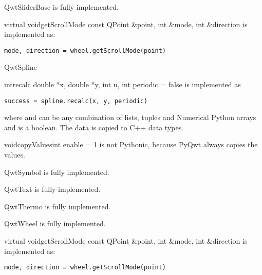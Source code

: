 \documentclass{manual}
\begin{document}
\begin{classdesc*}{QwtSliderBase}
  is fully implemented.

  \begin{cfuncdesc}{virtual void}{getScrollMode}{
      const QPoint \&point, int \&mode, int \&direction}
    is implemented as:
    \begin{verbatim}
mode, direction = wheel.getScrollMode(point)
    \end{verbatim}    
  \end{cfuncdesc}

\end{classdesc*}

\begin{classdesc*}{QwtSpline}
  
  \begin{cfuncdesc}{int}{recalc}{
      double *x, double *y, int n, int periodic = false}
    is implemented as
    \begin{verbatim}
success = spline.recalc(x, y, periodic)
    \end{verbatim}
    where  and  can be any combination of lists, tuples and
    Numerical Python arrays and  is a boolean.
    The data is copied to C++ data types.
  \end{cfuncdesc}
  
  \begin{cfuncdesc}{void}{copyValues}{int enable = 1}
    is not Pythonic, because PyQwt always copies the values.
  \end{cfuncdesc}

\end{classdesc*}
 
\begin{classdesc*}{QwtSymbol}
  is fully implemented.
\end{classdesc*}

\begin{classdesc*}{QwtText}
  is fully implemented.
\end{classdesc*}

\begin{classdesc*}{QwtThermo}
  is fully implemented.
\end{classdesc*}

\begin{classdesc*}{QwtWheel}
  is fully implemented.

  \begin{cfuncdesc}{virtual void}{getScrollMode}{
      const QPoint \&point, int \&mode, int \&direction}
    is implemented as:
    \begin{verbatim}
mode, direction = wheel.getScrollMode(point)
    \end{verbatim}    
  \end{cfuncdesc}

\end{classdesc*}
\end{document}
